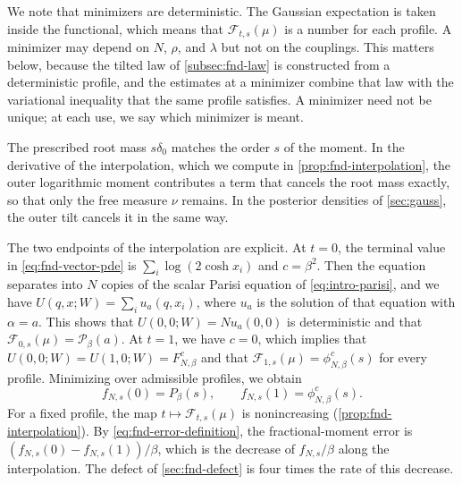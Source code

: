 We note that minimizers are deterministic. The Gaussian expectation is
taken inside
the functional, which means that $\mathcal F_{t,s}(\mu)$ is a number for
each profile. A minimizer may depend on $N$, $\rho$, and $\lambda$ but not
on the couplings. This matters below, because the tilted law of
\cref{subsec:fnd-law}
is constructed from a deterministic profile, and the estimates at a
minimizer combine that law with the variational inequality that the same
profile satisfies. A minimizer need not be unique; at each use, we say
which minimizer is meant.

The prescribed root mass $s\delta_0$ matches the order $s$ of the
moment. In the derivative of the interpolation, which we compute in
\cref{prop:fnd-interpolation}, the outer logarithmic moment
contributes a term that cancels the root mass exactly, so that only the
free measure $\nu$ remains. In the posterior densities of
\cref{sec:gauss}, the outer tilt cancels it in the same way.

The two endpoints of the interpolation are explicit. At $t=0$, the
terminal value in \eqref{eq:fnd-vector-pde} is $\sum_i\log(2\cosh x_i)$
and $c=\beta^2$. Then the equation separates into $N$ copies of the
scalar Parisi equation of \eqref{eq:intro-parisi}, and we have
$U(q,x;W)=\sum_iu_a(q,x_i)$, where $u_a$ is the solution of that
equation with $\alpha=a$. This shows that $U(0,0;W)=Nu_a(0,0)$ is
deterministic and that
$\mathcal F_{0,s}(\mu)=\mathcal P_\beta(a)$. At
$t=1$, we have $c=0$, which implies that
$U(0,0;W)=U(1,0;W)=F^c_{N,\beta}$ and that
$\mathcal F_{1,s}(\mu)=\phi^c_{N,\beta}(s)$ for every profile.
Minimizing over admissible profiles, we obtain
\cite[Proposition~2.3]{AL}
\begin{equation}\label{eq:fnd-endpoints}
 f_{N,s}(0)=P_\beta(s),\qquad f_{N,s}(1)=\phi^c_{N,\beta}(s).
\end{equation}
For a fixed profile, the map $t\mapsto\mathcal F_{t,s}(\mu)$ is
nonincreasing (\cref{prop:fnd-interpolation}). By
\eqref{eq:fnd-error-definition}, the fractional-moment error is
$(f_{N,s}(0)-f_{N,s}(1))/\beta$, which is the decrease of $f_{N,s}/\beta$
along the interpolation. The defect of \cref{sec:fnd-defect} is four
times the rate of this decrease.

